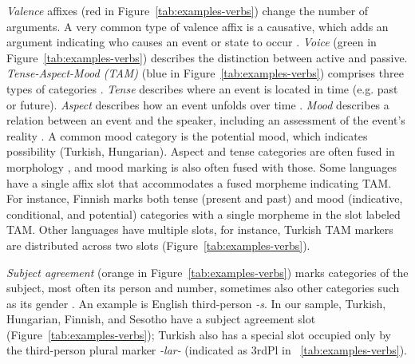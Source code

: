 \documentclass[11pt,letterpaper]{article}
\newcommand{\citep}{\parencite}
\begin{document}
\textit{Valence} affixes (red in Figure~\ref{tab:examples-verbs}) change the number of arguments. A very common type of valence affix is a causative, which adds an argument indicating who causes an event or state to occur \citep{wals-111}.
\textit{Voice} (green in Figure~\ref{tab:examples-verbs}) describes the distinction between active and passive. %
\textit{Tense-Aspect-Mood (TAM)} (blue in Figure~\ref{tab:examples-verbs}) comprises three types of categories \citep[Tense-Aspect-Mood,][]{bybee1994the, wals-69}.
\textit{Tense} describes where an event is located in time (e.g. past or future).
\textit{Aspect} describes how an event unfolds over time \citep{comrie1976aspect,dahl1985tense,binnick1991time}.
\textit{Mood} describes a relation between an event and the speaker, including an assessment of the event's reality \cite{palmer1986mood,portner2018mood}.
A common mood category is the potential mood, which indicates possibility (Turkish, Hungarian).
Aspect and tense categories are often fused in morphology \citep{binnick2012the}, and mood marking is also often fused with those. %
Some languages have a single affix slot that accommodates a fused morpheme indicating TAM.
For instance, Finnish marks both tense (present and past) and mood (indicative, conditional, and potential) categories with a single morpheme in the slot labeled TAM.
Other languages have multiple slots, for instance, Turkish TAM markers are distributed across two slots (Figure~\ref{tab:examples-verbs}).

\textit{Subject agreement} (orange in Figure~\ref{tab:examples-verbs}) marks categories of the subject, most often its person and number, sometimes also other categories such as its gender \citep{corbett2003agreement}.
An example is English third-person \textit{-s}.
In our sample, Turkish, Hungarian, Finnish, and Sesotho have a subject agreement slot (Figure~\ref{tab:examples-verbs}); Turkish also has a special slot occupied only by the third-person plural marker \textit{-lar-} (indicated as 3rdPl in ~\ref{tab:examples-verbs}).
\end{document}

